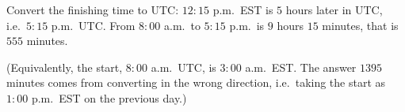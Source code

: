 Convert the finishing time to UTC: $12{:}15$ p.m.\ EST is $5$ hours later in UTC, i.e.\ $5{:}15$ p.m.\ UTC. From $8{:}00$ a.m.\ to $5{:}15$ p.m.\ is $9$ hours $15$ minutes, that is $\boxed{555}$ minutes.

(Equivalently, the start, $8{:}00$ a.m.\ UTC, is $3{:}00$ a.m.\ EST. The answer $1395$ minutes comes from converting in the wrong direction, i.e.\ taking the start as $1{:}00$ p.m.\ EST on the previous day.)
